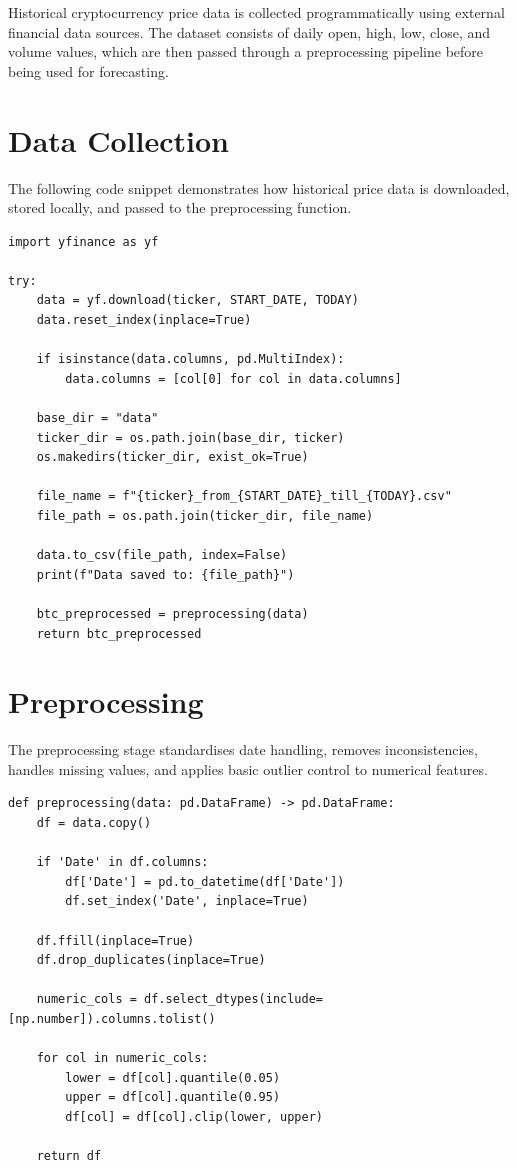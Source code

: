 \documentclass[12pt,a4paper]{report}
\begin{document}
Historical cryptocurrency price data is collected programmatically using external financial data sources. The dataset consists of daily open, high, low, close, and volume values, which are then passed through a preprocessing pipeline before being used for forecasting.

\section{Data Collection}

The following code snippet demonstrates how historical price data is downloaded, stored locally, and passed to the preprocessing function.

\begin{lstlisting}[caption={Cryptocurrency data collection and storage}]
import yfinance as yf

try:
    data = yf.download(ticker, START_DATE, TODAY)
    data.reset_index(inplace=True)

    if isinstance(data.columns, pd.MultiIndex):
        data.columns = [col[0] for col in data.columns]

    base_dir = "data"
    ticker_dir = os.path.join(base_dir, ticker)
    os.makedirs(ticker_dir, exist_ok=True)

    file_name = f"{ticker}_from_{START_DATE}_till_{TODAY}.csv"
    file_path = os.path.join(ticker_dir, file_name)

    data.to_csv(file_path, index=False)
    print(f"Data saved to: {file_path}")

    btc_preprocessed = preprocessing(data)
    return btc_preprocessed
\end{lstlisting}

\section{Preprocessing}

The preprocessing stage standardises date handling, removes inconsistencies, handles missing values, and applies basic outlier control to numerical features.

\begin{lstlisting}[caption={Data preprocessing function}]
def preprocessing(data: pd.DataFrame) -> pd.DataFrame:
    df = data.copy()

    if 'Date' in df.columns:
        df['Date'] = pd.to_datetime(df['Date'])
        df.set_index('Date', inplace=True)

    df.ffill(inplace=True)
    df.drop_duplicates(inplace=True)

    numeric_cols = df.select_dtypes(include=[np.number]).columns.tolist()

    for col in numeric_cols:
        lower = df[col].quantile(0.05)
        upper = df[col].quantile(0.95)
        df[col] = df[col].clip(lower, upper)

    return df
\end{lstlisting}
\end{document}
